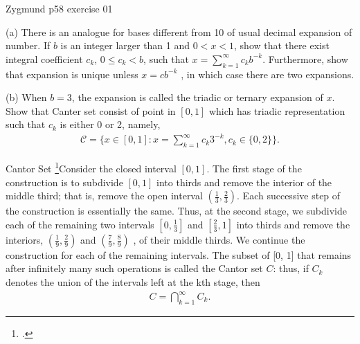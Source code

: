 \documentclass[UTF8,a4paper,10pt]{article}
\begin{document}

  \begin{Problem}[]{Zygmund p58 exercise 01}

    (a) There is an analogue for bases different from 10 of usual decimal expansion of number. If $b$ is an integer larger than 1 and $0 < x < 1$,
    show that there exist integral coefficient $c_k$, $0 \leq c_k < b$, such that $x = \sum_{k=1}^{\infty}c_k b^{-k}$. Furthermore, show that expansion is unique unless
    $x = cb^{-k}$
    , in which case there are two expansions.  


    (b) When $b = 3$, the expansion is called the triadic or ternary
    expansion of $x$. Show that Canter set consist of point in $[0,1]$ which has triadic representation such that $c_k$ is either 0 or 2, namely,
    \begin{equation*}
      \begin{aligned}
        \mathcal{C}  = \{x \in [0, 1] : x =\sum_{k=1}^{\infty}c_k 3^{-k}, c_k \in \{0, 2\}\}.
      \end{aligned}
    \end{equation*}
  \end{Problem}

  \begin{mybox}{Cantor Set}
    \footcite[][42-43]{Wheeden_Zygmund_2015}Consider the closed interval \([0, 1]\). The first stage of the construction is to
subdivide \([0, 1]\) into thirds and remove the interior of the middle third; that
is, remove the open interval \(\left(\frac{1}{3},\frac{2}{3}\right)\). Each successive step of the construction is essentially the same. Thus, at the second stage, we subdivide each of the
remaining two intervals \(\left[0,\frac{1}{3}\right]\)
and  \(\left[\frac{2}{3},1\right]\) into thirds and remove the interiors, \(\left(\frac{1}{9},\frac{2}{9}\right)\) and \(\left(\frac{7}{9},\frac{8}{9}\right)\)
, of their middle thirds. We continue the construction for each of the remaining intervals. The subset of [0, 1] that remains after infinitely many such operations is
called the Cantor set \(C\): thus, if \(C_k\) denotes the union of the intervals left at the
kth stage, then
\begin{equation*}
  \begin{aligned}
    C =  \bigcap_{k=1}^{\infty} C_k  .
  \end{aligned}
\end{equation*}

  \end{mybox}
\end{document}
